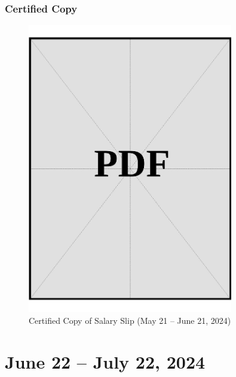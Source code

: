 \clearpage

\subsubsection*{Certified Copy}
\vspace*{\fill}

\begin{figure}[h]
    \centering
    \includegraphics[page=1, width=0.8\textwidth]{../docs/sponsor/funds/salary-slips/month-1/certified-copies.pdf}
    \caption{Certified Copy of Salary Slip (May 21 – June 21, 2024)}
    \label{fig:month-1-certified}
\end{figure}

\vspace*{\fill}
\clearpage

\section*{June 22 – July 22, 2024}

